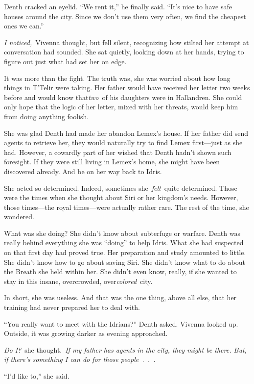 Denth cracked an eyelid. “We rent it,” he finally said. “It’s nice to have safe houses around the city. Since we don’t use them very often, we find the cheapest ones we can.”

\textit{I noticed,}~Vivenna thought, but fell silent, recognizing how stilted her attempt at conversation had sounded. She sat quietly, looking down at her hands, trying to figure out just what had set her on edge.

It was more than the fight. The truth was, she was worried about how long things in T’Telir were taking. Her father would have received her letter two weeks before and would know that\textit{two}~of his daughters were in Hallandren. She could only hope that the logic of her letter, mixed with her threats, would keep him from doing anything foolish.

She was glad Denth had made her abandon Lemex’s house. If her father did send agents to retrieve her, they would naturally try to find Lemex first—just as she had. However, a cowardly part of her wished that Denth hadn’t shown such foresight. If they were still living in Lemex’s home, she might have been discovered already. And be on her way back to Idris.

She acted so determined. Indeed, sometimes she~\textit{felt}~quite determined. Those were the times when she thought about Siri or her kingdom’s needs. However, those times—the royal times—were actually rather rare. The rest of the time, she wondered.

What was she doing? She didn’t know about subterfuge or warfare. Denth was really behind everything she was “doing” to help Idris. What she had suspected on that first day had proved true. Her preparation and study amounted to little. She didn’t know how to go about saving Siri. She didn’t know what to do about the Breath she held within her. She didn’t even know, really, if she wanted to stay in this insane, overcrowded, over\textit{colored}~city.

In short, she was useless. And that was the one thing, above all else, that her training had never prepared her to deal with.

“You really want to meet with the Idrians?” Denth asked. Vivenna looked up. Outside, it was growing darker as evening approached.

\textit{Do I?}~she thought.~\textit{If my father has agents in the city, they might be there. But, if there’s something I can do for those people~.~.~.}

“I’d like to,” she said.


